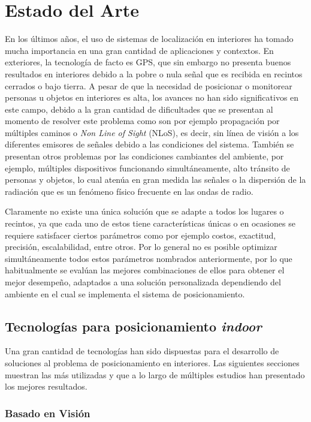 \chapter{Estado del Arte}

En los últimos años, el uso de sistemas de localización en interiores ha tomado mucha importancia en una gran cantidad de aplicaciones y contextos. En exteriores, la tecnología de facto es GPS, que sin embargo no presenta buenos resultados en interiores debido a la pobre o nula señal que es recibida en recintos cerrados o bajo tierra. A pesar de que la necesidad de posicionar o monitorear personas u objetos en interiores es alta, los avances no han sido significativos en este campo, debido a la gran cantidad de dificultades que se presentan al momento de resolver este problema como son por ejemplo propagación por múltiples caminos o \textit{Non Line of Sight} (NLoS), es decir, sin línea de visión a los diferentes emisores de señales debido a las condiciones del sistema. También se presentan otros problemas por las condiciones cambiantes del ambiente, por ejemplo, múltiples dispositivos funcionando simultáneamente, alto tránsito de personas y objetos, lo cual atenúa en gran medida las señales o la dispersión de la radiación que es un fenómeno físico frecuente en las ondas de radio.

Claramente no existe una única solución que se adapte a todos los lugares o recintos, ya que cada uno de estos tiene características únicas o en ocasiones se requiere satisfacer ciertos parámetros como por ejemplo costos, exactitud, precisión, escalabilidad, entre otros. Por lo general no es posible optimizar simultáneamente todos estos parámetros nombrados anteriormente, por lo que habitualmente se evalúan las mejores combinaciones de ellos para obtener el mejor desempeño, adaptados a una solución personalizada dependiendo del ambiente en el cual se implementa el sistema de posicionamiento.

\section{Tecnologías para posicionamiento \textit{indoor}}

Una gran cantidad de tecnologías han sido dispuestas para el desarrollo de soluciones al problema de posicionamiento en interiores. Las siguientes secciones muestran las más utilizadas y que a lo largo de múltiples estudios han presentado los mejores resultados.

\subsection{Basado en Visión}

